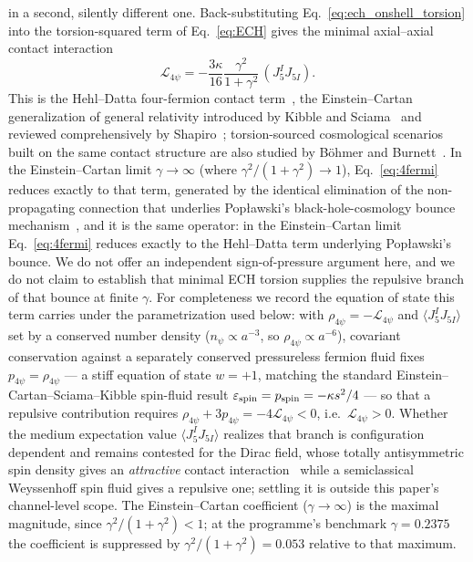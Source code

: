 \documentclass[aps,prd,twocolumn,superscriptaddress,preprintnumbers,nofootinbib,longbibliography,floatfix]{revtex4-2}
\begin{document}
in a second, silently different one. Back-substituting
Eq.~\eqref{eq:ech_onshell_torsion} into the torsion-squared term of
Eq.~\eqref{eq:ECH} gives the minimal axial--axial contact interaction
\begin{equation}\label{eq:4fermi}
\mathcal L_{4\psi}=-\frac{3\kappa}{16}\frac{\gamma^2}{1+\gamma^2}\,
(J_5^I J_{5I}).
\end{equation}
This is the Hehl--Datta four-fermion contact
term~\cite{HehlDattaNJL1971,Hehl1976}, the Einstein--Cartan generalization
of general relativity introduced by Kibble and
Sciama~\cite{Kibble1961,Sciama1964} and reviewed comprehensively by
Shapiro~\cite{Shapiro2002}; torsion-sourced cosmological scenarios built
on the same contact structure are also studied by
B\"ohmer and Burnett~\cite{BoehmerBurnett2008}. In the Einstein--Cartan limit
$\gamma\to\infty$ (where $\gamma^2/(1+\gamma^2)\to1$),
Eq.~\eqref{eq:4fermi} reduces exactly to that term, generated by the
identical elimination of the non-propagating connection that underlies
Pop{\l}awski's black-hole-cosmology bounce
mechanism~\cite{Poplawski2010}, and it is the same operator: in the
Einstein--Cartan limit Eq.~\eqref{eq:4fermi} reduces exactly to the
Hehl--Datta term underlying Pop{\l}awski's bounce. We do not offer an
independent sign-of-pressure argument here, and we do not claim to
establish that minimal ECH torsion supplies the repulsive branch of that
bounce at finite $\gamma$. For completeness we record the equation of
state this term carries under the parametrization used below: with
$\rho_{4\psi}=-\mathcal L_{4\psi}$ and $\langle J_5^IJ_{5I}\rangle$ set by
a conserved number density ($n_\psi\propto a^{-3}$, so
$\rho_{4\psi}\propto a^{-6}$), covariant conservation against a
separately conserved pressureless fermion fluid fixes
$p_{4\psi}=\rho_{4\psi}$ --- a stiff equation of state $w=+1$, matching
the standard Einstein--Cartan--Sciama--Kibble spin-fluid result
$\varepsilon_{\rm spin}=p_{\rm spin}=-\kappa s^2/4$ --- so that a
repulsive contribution requires
$\rho_{4\psi}+3p_{4\psi}=-4\mathcal L_{4\psi}<0$, i.e.\
$\mathcal L_{4\psi}>0$. Whether the medium expectation value
$\langle J_5^IJ_{5I}\rangle$ realizes that branch is configuration
dependent and remains contested for the Dirac field, whose totally
antisymmetric spin density gives an \emph{attractive} contact
interaction~\cite{Kerlick1975,OConnell1977} while a semiclassical
Weyssenhoff spin fluid gives a repulsive one; settling it is outside
this paper's channel-level scope. The Einstein--Cartan coefficient ($\gamma\to\infty$) is the
maximal magnitude, since $\gamma^2/(1+\gamma^2)<1$; at the programme's
benchmark $\gamma=0.2375$ the coefficient is suppressed by
$\gamma^2/(1+\gamma^2)=0.053$ relative to that maximum.
\end{document}
